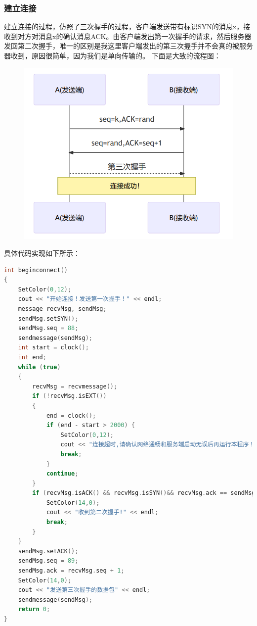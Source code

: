 \documentclass[UTF8,a4paper,10pt]{ctexart}
\begin{document}
\subsubsection{建立连接}
建立连接的过程，仿照了三次握手的过程，客户端发送带有标识SYN的消息x，接收到对方对消息x的确认消息ACK。由客户端发出第一次握手的请求，然后服务器发回第二次握手，唯一的区别是我这里客户端发出的第三次握手并不会真的被服务器收到，原因很简单，因为我们是单向传输的。
下面是大致的流程图：
\begin{figure}[H]
    \centering
    \includegraphics[scale=0.6]{计网2.png}
    \label{fig:2}
\end{figure}
具体代码实现如下所示：
\begin{lstlisting}[title=客户端,frame=trbl,language={C++}]
int beginconnect()
{
    SetColor(0,12);
    cout << "开始连接！发送第一次握手！" << endl;
    message recvMsg, sendMsg;
    sendMsg.setSYN();
    sendMsg.seq = 88;
    sendmessage(sendMsg);
    int start = clock();
    int end;
    while (true)
    {
        recvMsg = recvmessage();
        if (!recvMsg.isEXT())
        {
            end = clock();
            if (end - start > 2000) {
                SetColor(0,12);
                cout << "连接超时,请确认网络通畅和服务端启动无误后再运行本程序！" << endl;
                break;
            }
            continue;
        }
        if (recvMsg.isACK() && recvMsg.isSYN()&& recvMsg.ack == sendMsg.seq + 1) {
            SetColor(14,0);
            cout << "收到第二次握手!" << endl;
            break;
        }
    }
    sendMsg.setACK();
    sendMsg.seq = 89;
    sendMsg.ack = recvMsg.seq + 1;
    SetColor(14,0);
    cout << "发送第三次握手的数据包" << endl;
    sendmessage(sendMsg);
    return 0;
}
\end{lstlisting}
\end{document}
